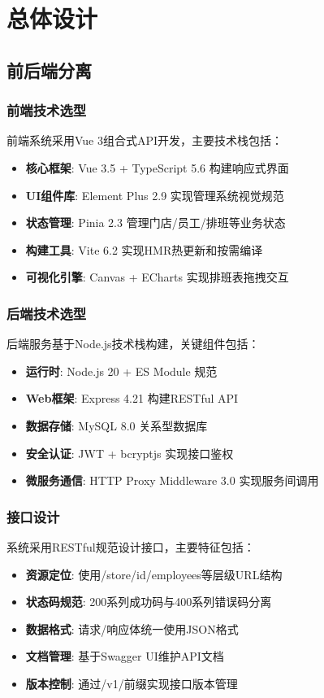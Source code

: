 \documentclass{ctexart}
\begin{document}
\section{总体设计}
\subsection{前后端分离}
\subsubsection{前端技术选型}
前端系统采用Vue 3组合式API开发，主要技术栈包括：
\begin{itemize}
    \item \textbf{核心框架}: Vue 3.5 + TypeScript 5.6 构建响应式界面
    \item \textbf{UI组件库}: Element Plus 2.9 实现管理系统视觉规范
    \item \textbf{状态管理}: Pinia 2.3 管理门店/员工/排班等业务状态
    \item \textbf{构建工具}: Vite 6.2 实现HMR热更新和按需编译
    \item \textbf{可视化引擎}: Canvas + ECharts 实现排班表拖拽交互
\end{itemize}

\subsubsection{后端技术选型}
后端服务基于Node.js技术栈构建，关键组件包括：
\begin{itemize}
    \item \textbf{运行时}: Node.js 20 + ES Module 规范
    \item \textbf{Web框架}: Express 4.21 构建RESTful API
    \item \textbf{数据存储}: MySQL 8.0 关系型数据库
    \item \textbf{安全认证}: JWT + bcryptjs 实现接口鉴权
    \item \textbf{微服务通信}: HTTP Proxy Middleware 3.0 实现服务间调用
\end{itemize}

\subsubsection{接口设计}
系统采用RESTful规范设计接口，主要特征包括：
\begin{itemize}
    \item \textbf{资源定位}: 使用/store/{id}/employees等层级URL结构
    \item \textbf{状态码规范}: 200系列成功码与400系列错误码分离
    \item \textbf{数据格式}: 请求/响应体统一使用JSON格式
    \item \textbf{文档管理}: 基于Swagger UI维护API文档
    \item \textbf{版本控制}: 通过/v1/前缀实现接口版本管理
\end{itemize}
\end{document}
